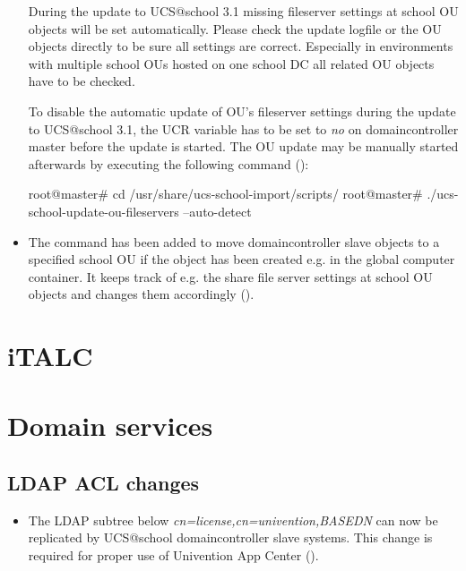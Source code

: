 \begin{itemize}
  During the update to UCS@school 3.1 missing fileserver settings at school OU objects will be set
  automatically. Please check the update logfile or the OU objects directly to be sure all settings are
  correct. Especially in environments with multiple school OUs hosted on one school DC all related OU objects
  have to be checked.

  To disable the automatic update of OU's fileserver settings during the update to UCS@school 3.1, the
  UCR variable  has to be set to \emph{no} on domaincontroller master
  before the update is started. The OU update may be manually started afterwards by executing the following
  command ():\\
  \begin{ucsConsoleInput}
root@master# cd /usr/share/ucs-school-import/scripts/
root@master# ./ucs-school-update-ou-fileservers --auto-detect
  \end{ucsConsoleInput}

\item The command  has been added to move domaincontroller slave
  objects to a specified school OU if the object has been created e.g. in the global computer container. It
  keeps track of e.g. the share file server settings at school OU objects and changes them accordingly ().

\end{itemize}

\section{iTALC}
%

\section{Domain services}


\subsection{LDAP ACL changes}
\begin{itemize}
\item The LDAP subtree below \emph{cn=license,cn=univention,BASEDN} can now be replicated by UCS@school
  domaincontroller slave systems. This change is required for proper use of Univention App Center
  ().
\end{itemize}

